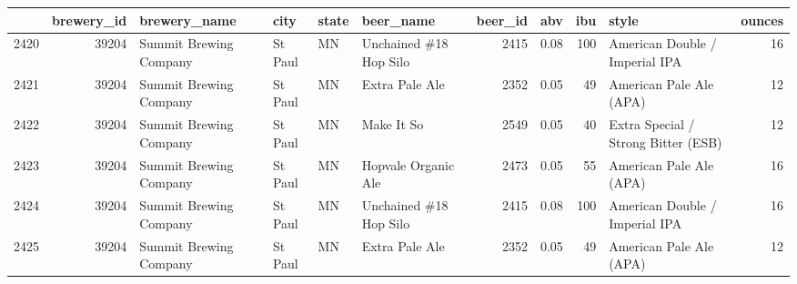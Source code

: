 \documentclass[]{article}
\begin{document}
\begin{longtable}[]{@{}lrllllrrrlr@{}}
\toprule
& brewery\_id & brewery\_name & city & state & beer\_name & beer\_id &
abv & ibu & style & ounces\tabularnewline
\midrule
\endhead
2420 & 39204 & Summit Brewing Company & St Paul & MN & Unchained \#18
Hop Silo & 2415 & 0.08 & 100 & American Double / Imperial IPA &
16\tabularnewline
2421 & 39204 & Summit Brewing Company & St Paul & MN & Extra Pale Ale &
2352 & 0.05 & 49 & American Pale Ale (APA) & 12\tabularnewline
2422 & 39204 & Summit Brewing Company & St Paul & MN & Make It So & 2549
& 0.05 & 40 & Extra Special / Strong Bitter (ESB) & 12\tabularnewline
2423 & 39204 & Summit Brewing Company & St Paul & MN & Hopvale Organic
Ale & 2473 & 0.05 & 55 & American Pale Ale (APA) & 16\tabularnewline
2424 & 39204 & Summit Brewing Company & St Paul & MN & Unchained \#18
Hop Silo & 2415 & 0.08 & 100 & American Double / Imperial IPA &
16\tabularnewline
2425 & 39204 & Summit Brewing Company & St Paul & MN & Extra Pale Ale &
2352 & 0.05 & 49 & American Pale Ale (APA) & 12\tabularnewline
\bottomrule
\end{longtable}
\end{document}
